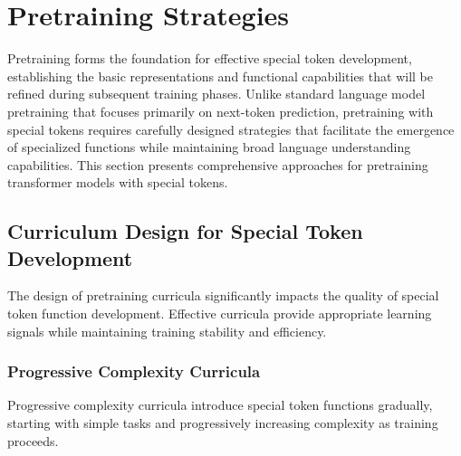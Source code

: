 
\section{Pretraining Strategies}

Pretraining forms the foundation for effective special token development, establishing the basic representations and functional capabilities that will be refined during subsequent training phases. Unlike standard language model pretraining that focuses primarily on next-token prediction, pretraining with special tokens requires carefully designed strategies that facilitate the emergence of specialized functions while maintaining broad language understanding capabilities. This section presents comprehensive approaches for pretraining transformer models with special tokens.

\subsection{Curriculum Design for Special Token Development}

The design of pretraining curricula significantly impacts the quality of special token function development. Effective curricula provide appropriate learning signals while maintaining training stability and efficiency.

\subsubsection{Progressive Complexity Curricula}

Progressive complexity curricula introduce special token functions gradually, starting with simple tasks and progressively increasing complexity as training proceeds.

